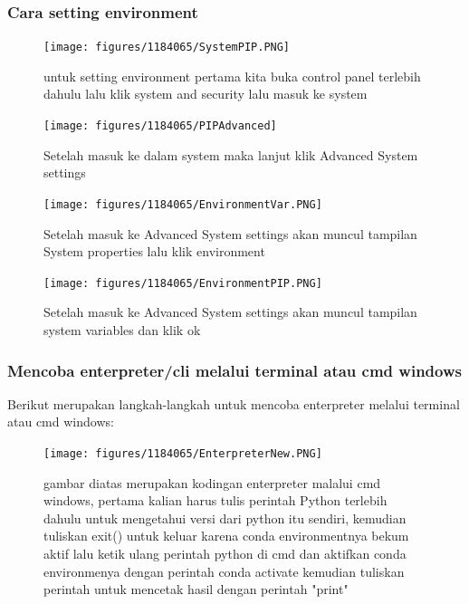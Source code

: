 \subsubsection{Cara setting environment}
	\begin{figure}[H]
		\texttt{[image: figures/1184065/SystemPIP.PNG]}
		\centering
		\caption{untuk setting environment pertama kita buka control panel terlebih dahulu lalu klik system and security lalu masuk ke system}
	\end{figure}
	\begin{figure}[H]
		\texttt{[image: figures/1184065/PIPAdvanced]}
		\centering
		\caption{Setelah masuk ke dalam system maka lanjut klik Advanced System settings}
	\end{figure}
	\begin{figure}[H]
		\texttt{[image: figures/1184065/EnvironmentVar.PNG]}
		\centering
		\caption{Setelah masuk ke Advanced System settings akan muncul tampilan System properties lalu klik environment}
	\end{figure}
	\begin{figure}[H]
		\texttt{[image: figures/1184065/EnvironmentPIP.PNG]}
		\centering
		\caption{Setelah masuk ke Advanced System settings akan muncul tampilan system variables dan klik ok}
	\end{figure}
\subsubsection{Mencoba enterpreter/cli melalui terminal atau cmd windows}
Berikut merupakan langkah-langkah untuk mencoba enterpreter melalui terminal atau cmd windows:
\begin{figure}[H]
		\texttt{[image: figures/1184065/EnterpreterNew.PNG]}
		\centering
		\caption{gambar diatas merupakan kodingan enterpreter malalui cmd windows, pertama kalian harus tulis perintah Python terlebih dahulu untuk mengetahui versi dari python itu sendiri, kemudian tuliskan exit() untuk keluar karena conda environmentnya bekum aktif lalu ketik ulang perintah python di cmd dan aktifkan conda environmenya dengan perintah conda activate kemudian tuliskan perintah untuk mencetak hasil dengan perintah "print" }
	\end{figure}

